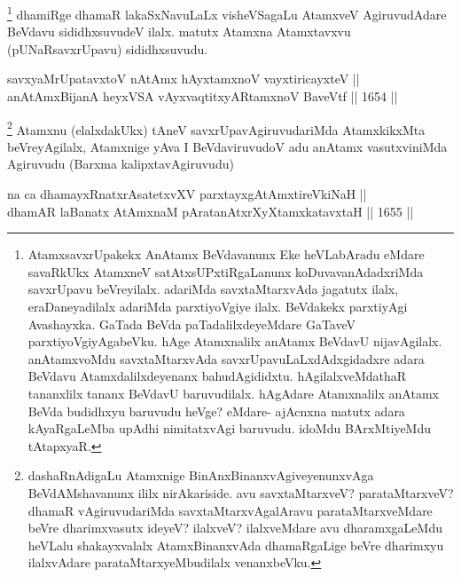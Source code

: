 \begin{artha}
\footnote{AtamxsavxrUpakekx AnAtamx BeVdavanunx Eke heVLabAradu eMdare savaRkUkx AtamxneV satAtxsUPxtiRgaLanunx koDuvavanAdadxriMda savxrUpavu beVreyilalx. adariMda savxtaMtarxvAda jagatutx ilalx, eraDaneyadilalx adariMda parxtiyoVgiye ilalx. BeVdakekx parxtiyAgi Avashayxka. GaTada BeVda paTadalilxdeyeMdare GaTaveV parxtiyoVgiyAgabeVku. hAge Atamxnalilx anAtamx BeVdavU nijavAgilalx. anAtamxvoMdu savxtaMtarxvAda savxrUpavuLaLxdAdxgidadxre adara BeVdavu Atamxdalilxdeyenanx bahudAgididxtu. hAgilalxveMdathaR tananxlilx tananx BeVdavU baruvudilalx. hAgAdare Atamxnalilx anAtamx BeVda budidhxyu baruvudu heVge? eMdare- ajAcnxna matutx adara kAyaRgaLeMba upAdhi nimitatxvAgi baruvudu. idoMdu BArxMtiyeMdu tAtapxyaR.}
dhamiRge dhamaR lakaSxNavuLaLx visheVSagaLu AtamxveV AgiruvudAdare BeVdavu sididhxsuvudeV ilalx. matutx Atamxna Atamxtavxvu (pUNaRsavxrUpavu) sididhxsuvudu.
\end{artha}



\begin{shl}
savxyaMrUpatavxtoV nA\s \s tAmx hAyxtamxnoV vayxtiricayxteV || \\
anAtAmxBijanA heyxVSA vAyxvaqtitxyAR\s \s tamxnoV BaveVtf ||  1654 ||  
\end{shl}

\begin{artha}
\footnote{dashaRnAdigaLu Atamxnige BinAnxBinanxvAgiveyenunxvAga BeVdAMshavanunx ililx nirAkariside. avu savxtaMtarxveV? parataMtarxveV? dhamaR vAgiruvudariMda savxtaMtarxvAgalAravu parataMtarxveMdare beVre dharimxvasutx ideyeV? ilalxveV? ilalxveMdare avu dharamxgaLeMdu heVLalu shakayxvalalx AtamxBinanxvAda dhamaRgaLige beVre dharimxyu ilalxvAdare parataMtarxyeMbudilalx venanxbeVku.}
Atamxnu (elalxdakUkx) tAneV savxrUpavAgiruvudariMda AtamxkikxMta beVreyAgilalx, Atamxnige yAva I BeVdaviruvudoV adu anAtamx vasutxviniMda Agiruvudu (Barxma kalipxtavAgiruvudu)
\end{artha}

\begin{shl}
na ca dhamayxRnatxrAsatetxvXV parxtayxgAtAmxtireVkiNaH ||  \\
dhamAR laBanatx AtAmxnaM pAratanAtxrXyXtamxkatavxtaH ||  1655 ||  
\end{shl}

